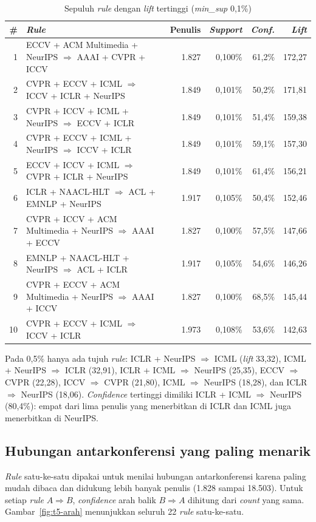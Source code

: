 \begin{table}[ht]
\caption{Sepuluh \textit{rule} dengan \textit{lift} tertinggi (\textit{min\_sup} 0,1\%)}
\label{tab:t5-top10}
\footnotesize
\begin{tabularx}{\textwidth}{@{}r>{\raggedright\arraybackslash}Xrrrr@{}}
\toprule
\textbf{\#} & \textbf{\textit{Rule}} & \textbf{Penulis} & \textbf{\textit{Support}} & \textbf{\textit{Conf.}} & \textbf{\textit{Lift}} \\
\midrule
1 & ECCV + ACM Multimedia + NeurIPS $\Rightarrow$ AAAI + CVPR + ICCV & 1.827 & 0,100\% & 61,2\% & 172,27 \\
2 & CVPR + ECCV + ICML $\Rightarrow$ ICCV + ICLR + NeurIPS & 1.849 & 0,101\% & 50,2\% & 171,81 \\
3 & CVPR + ICCV + ICML + NeurIPS $\Rightarrow$ ECCV + ICLR & 1.849 & 0,101\% & 51,4\% & 159,38 \\
4 & CVPR + ECCV + ICML + NeurIPS $\Rightarrow$ ICCV + ICLR & 1.849 & 0,101\% & 59,1\% & 157,30 \\
5 & ECCV + ICCV + ICML $\Rightarrow$ CVPR + ICLR + NeurIPS & 1.849 & 0,101\% & 61,4\% & 156,21 \\
6 & ICLR + NAACL-HLT $\Rightarrow$ ACL + EMNLP + NeurIPS & 1.917 & 0,105\% & 50,4\% & 152,46 \\
7 & CVPR + ICCV + ACM Multimedia + NeurIPS $\Rightarrow$ AAAI + ECCV & 1.827 & 0,100\% & 57,5\% & 147,66 \\
8 & EMNLP + NAACL-HLT + NeurIPS $\Rightarrow$ ACL + ICLR & 1.917 & 0,105\% & 54,6\% & 146,26 \\
9 & CVPR + ECCV + ACM Multimedia + NeurIPS $\Rightarrow$ AAAI + ICCV & 1.827 & 0,100\% & 68,5\% & 145,44 \\
10 & CVPR + ECCV + ICML $\Rightarrow$ ICCV + ICLR & 1.973 & 0,108\% & 53,6\% & 142,63 \\
\bottomrule
\end{tabularx}
\end{table}

Pada 0,5\% hanya ada tujuh \textit{rule}: ICLR + NeurIPS $\Rightarrow$ ICML (\textit{lift} 33,32), ICML + NeurIPS $\Rightarrow$ ICLR (32,91), ICLR + ICML $\Rightarrow$ NeurIPS (25,35), ECCV $\Rightarrow$ CVPR (22,28), ICCV $\Rightarrow$ CVPR (21,80), ICML $\Rightarrow$ NeurIPS (18,28), dan ICLR $\Rightarrow$ NeurIPS (18,06). \textit{Confidence} tertinggi dimiliki ICLR + ICML $\Rightarrow$ NeurIPS (80,4\%): empat dari lima penulis yang menerbitkan di ICLR dan ICML juga menerbitkan di NeurIPS.

\subsection{Hubungan antarkonferensi yang paling menarik}
\label{sec:hasil-t5-menarik}
\textit{Rule} satu-ke-satu dipakai untuk menilai hubungan antarkonferensi karena paling mudah dibaca dan didukung lebih banyak penulis (1.828 sampai 18.503). Untuk setiap \textit{rule} $A \Rightarrow B$, \textit{confidence} arah balik $B \Rightarrow A$ dihitung dari \textit{count} yang sama. Gambar~\ref{fig:t5-arah} menunjukkan seluruh 22 \textit{rule} satu-ke-satu.

